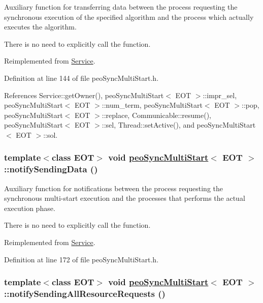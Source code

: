 Auxiliary function for transferring data between the process requesting the synchronous execution of the specified algorithm and the process which actually executes the algorithm. 

There is no need to explicitly call the function. 

Reimplemented from \hyperlink{classService_45c06344edbfa482b91f68e2035a6099}{Service}.

Definition at line 144 of file peo\-Sync\-Multi\-Start.h.

References Service::get\-Owner(), peo\-Sync\-Multi\-Start$<$ EOT $>$::impr\_\-sel, peo\-Sync\-Multi\-Start$<$ EOT $>$::num\_\-term, peo\-Sync\-Multi\-Start$<$ EOT $>$::pop, peo\-Sync\-Multi\-Start$<$ EOT $>$::replace, Communicable::resume(), peo\-Sync\-Multi\-Start$<$ EOT $>$::sel, Thread::set\-Active(), and peo\-Sync\-Multi\-Start$<$ EOT $>$::sol.\hypertarget{classpeoSyncMultiStart_32ec0d01d3fd8a9932abd68f4781fc94}{
\subsubsection[notifySendingData]{\setlength{\rightskip}{0pt plus 5cm}template$<$class EOT$>$ void \hyperlink{classpeoSyncMultiStart}{peo\-Sync\-Multi\-Start}$<$ EOT $>$::notify\-Sending\-Data ()}}
\label{classpeoSyncMultiStart_32ec0d01d3fd8a9932abd68f4781fc94}


Auxiliary function for notifications between the process requesting the synchronous multi-start execution and the processes that performs the actual execution phase. 

There is no need to explicitly call the function. 

Reimplemented from \hyperlink{classService_81ad4d6ebb50045b8977e2ab74826f30}{Service}.

Definition at line 172 of file peo\-Sync\-Multi\-Start.h.\hypertarget{classpeoSyncMultiStart_fc90282cc4e93cdea8f82fd52dd78fb0}{
\subsubsection[notifySendingAllResourceRequests]{\setlength{\rightskip}{0pt plus 5cm}template$<$class EOT$>$ void \hyperlink{classpeoSyncMultiStart}{peo\-Sync\-Multi\-Start}$<$ EOT $>$::notify\-Sending\-All\-Resource\-Requests ()}}
\label{classpeoSyncMultiStart_fc90282cc4e93cdea8f82fd52dd78fb0}


